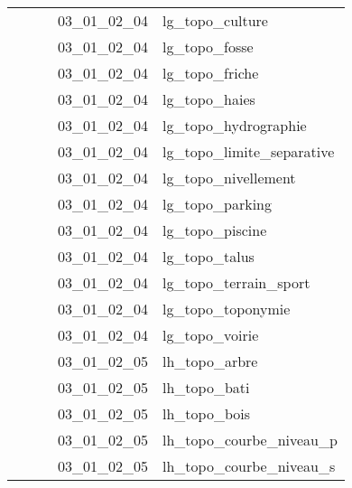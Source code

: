 \documentclass[12pt,titlepage,oneside]{book}
\begin{document}
\begin{supertabular}{|p{7.5cm}|p{7.5cm}|p{7.5cm}|c|p{10cm}|}
                   &                    &                    & 03\_01\_02\_04 & lg\_topo\_culture\\
                   &                    &                    & 03\_01\_02\_04 & lg\_topo\_fosse\\
                   &                    &                    & 03\_01\_02\_04 & lg\_topo\_friche\\
                   &                    &                    & 03\_01\_02\_04 & lg\_topo\_haies\\
                   &                    &                    & 03\_01\_02\_04 & lg\_topo\_hydrographie\\
                   &                    &                    & 03\_01\_02\_04 & lg\_topo\_limite\_separative\\
                   &                    &                    & 03\_01\_02\_04 & lg\_topo\_nivellement\\
                   &                    &                    & 03\_01\_02\_04 & lg\_topo\_parking\\
                   &                    &                    & 03\_01\_02\_04 & lg\_topo\_piscine\\
                   &                    &                    & 03\_01\_02\_04 & lg\_topo\_talus\\
                   &                    &                    & 03\_01\_02\_04 & lg\_topo\_terrain\_sport\\
                   &                    &                    & 03\_01\_02\_04 & lg\_topo\_toponymie\\
                   &                    &                    & 03\_01\_02\_04 & lg\_topo\_voirie\\
                   &                    &                    & 03\_01\_02\_05 & lh\_topo\_arbre\\
                   &                    &                    & 03\_01\_02\_05 & lh\_topo\_bati\\
                   &                    &                    & 03\_01\_02\_05 & lh\_topo\_bois\\
                   &                    &                    & 03\_01\_02\_05 & lh\_topo\_courbe\_niveau\_p\\
                   &                    &                    & 03\_01\_02\_05 & lh\_topo\_courbe\_niveau\_s\\

\end{supertabular}
\end{document}
